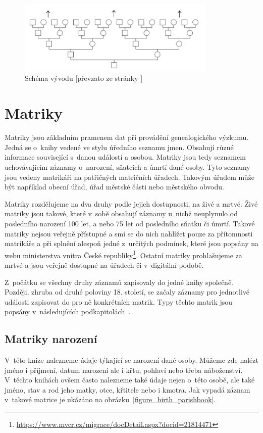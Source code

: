 \begin{figure}[H]
	\centering
	\includegraphics[width=95mm]{obrazky-figures/vyvod.jpg}
	\caption[Schéma vývodu]{Schéma vývodu [převzato ze stránky \cite{schema}]}
	\label{figure_vyvod}
\end{figure}

\section{Matriky}
Matriky jsou základním pramenem dat při provádění genealogického výzkumu. Jedná se o~knihy vedené ve stylu úředního seznamu jmen. Obsahují různé informace související s~danou událostí a osobou. Matriky jsou tedy seznamem uchovávajícím záznamy o~narození, sňatcích a úmrtí dané osoby. Tyto seznamy jsou vedeny matrikáři na patřičných matričních úřadech. Takovým úřadem může být například obecní úřad, úřad městské části nebo městského obvodu.

Matriky rozdělujeme na dva druhy podle jejich dostupnosti, na živé a mrtvé. Živé matriky jsou takové, které v~sobě obsahují záznamy u~nichž neuplynulo od posledního narození 100 let, a nebo 75 let od posledního sňatku či úmrtí. Takové matriky nejsou veřejně přístupné a smí se do nich nahlížet pouze za přítomnosti matrikáře a při splnění alespoň jedné z~určitých podmínek, které jsou popsány na webu ministerstva vnitra České republiky\footnote{\url{https://www.mvcr.cz/migrace/docDetail.aspx?docid=21814471}}. Ostatní matriky prohlašujeme za mrtvé a jsou veřejně dostupné na úřadech či v~digitální podobě.

Z~počátku se všechny druhy záznamů zapisovaly do jedné knihy společně. Později, zhruba od druhé poloviny 18. století, se začaly záznamy pro jednotlivé události zapisovat do pro ně konkrétních matrik. Typy těchto matrik jsou popsány v~následujících podkapitolách~\cite{Matriky}.

\subsection{Matriky narození}
V~této knize nalezneme údaje týkající se narození dané osoby. Můžeme zde nalézt jméno i příjmení, datum narození ale i křtu, pohlaví nebo třeba náboženství. V~těchto knihách ovšem často nalezneme také údaje nejen o~této osobě, ale také jméno, stav a rod jeho matky, otce, křtitele nebo i kmotra. Jak vypadá záznam v~takové matrice je ukázáno na obrázku~\ref{figure_birth_parishbook}.

